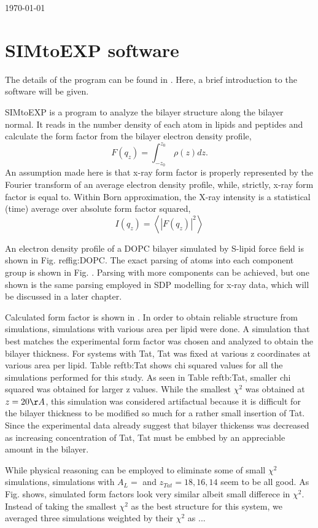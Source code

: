 \documentclass[letterpaper,12pt]{article}
\begin{document}
\today

\section{SIMtoEXP software}
The details of the program can be found in \cite{ref:Kucerka10}. Here, a brief
introduction to the software will be given.

SIMtoEXP is a program to analyze the bilayer structure along the bilayer normal.
It reads in the number density of each atom in lipids and peptides and calculate
the form factor from the bilayer electron density profile,
\begin{equation}
  F(q_z) = \int_{-z_0}^{z_0} \, \rho(z) dz.
\end{equation}
An assumption made here is that x-ray form factor is properly represented by 
the Fourier transform of an average electron density profile, while, strictly,
x-ray form factor is equal to.
Within Born approximation, the X-ray intensity is a statistical (time) average 
over absolute form factor squared,
\begin{equation}
  I(q_z) = \left< |F(q_z)|^2 \right>
\end{equation}

An electron density profile of a DOPC bilayer simulated by S-lipid force field 
is shown in Fig. ref{fig:DOPC}. The exact parsing of atoms into each component
group is shown in Fig. . Parsing with more components
can be achieved, but one shown is the same parsing employed in SDP modelling for
x-ray data, which will be discussed in a later chapter. 

Calculated form factor is shown in . In order to obtain 
reliable structure from simulations, simulations with various area per lipid 
were done. A simulation that best matches the experimental form factor was 
chosen and analyzed to obtain the bilayer thickness. For systems with Tat, 
Tat was fixed at various z coordinates at various area per lipid. Table ref{tb:Tat}
shows chi squared values for all the simulations performed for this study. As 
seen in Table ref{tb:Tat}, smaller chi squared was obtained for larger z values.
While the smallest $\chi^2$ was obtained at $z = 20 \AA$, this simulation was
considered artifactual because it is difficult for the bilayer thickness to be
modified so much for a rather small insertion of Tat. Since the experimental
data already suggest that bilayer thickenss was decreased as increasing 
concentration of Tat, Tat must be embbed by an appreciable amount in the bilayer.

While physical reasoning can be employed to eliminate some of small $\chi^2$ 
simulations, simulations with $A_L=$ and $z_{Tat}=18, 16, 14$ seem to be all good.
As Fig. shows, simulated form factors look very similar
albeit small differece in $\chi^2$. Instead of taking the smallest $\chi^2$ as
the best structure for this system, we averaged three simulations weighted by
their $\chi^2$ as ... 



\end{document}
